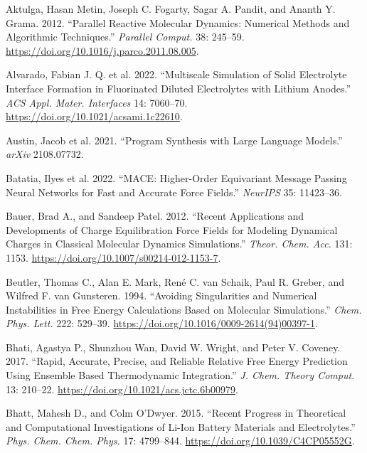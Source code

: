 \documentclass[
  11pt,
]{article}
\newlength{\cslhangindent}
\newenvironment{CSLReferences}[2] %
 {\begin{list}{}{%
  \setlength{\itemindent}{0pt}
  \setlength{\leftmargin}{0pt}
  \setlength{\parsep}{0pt}
  \ifodd #1
   \setlength{\leftmargin}{\cslhangindent}
   \setlength{\itemindent}{-1\cslhangindent}
  \fi
  \setlength{\itemsep}{#2\baselineskip}}}
 {\end{list}}
\begin{document}
\protect{}\label{refs}
\begin{CSLReferences}{1}{1}
Aktulga, Hasan Metin, Joseph C. Fogarty, Sagar A. Pandit, and Ananth Y.
Grama. 2012. {``Parallel Reactive Molecular Dynamics: Numerical Methods
and Algorithmic Techniques.''} \emph{Parallel Comput.} 38: 245--59.
\url{https://doi.org/10.1016/j.parco.2011.08.005}.

{Alvarado, Fabian J. Q. et al.} 2022. {``Multiscale Simulation of Solid
Electrolyte Interface Formation in Fluorinated Diluted Electrolytes with
Lithium Anodes.''} \emph{ACS Appl. Mater. Interfaces} 14: 7060--70.
\url{https://doi.org/10.1021/acsami.1c22610}.

{Austin, Jacob et al.} 2021. {``Program Synthesis with Large Language
Models.''} \emph{arXiv} 2108.07732.

{Batatia, Ilyes et al.} 2022. {``{MACE}: Higher-Order Equivariant
Message Passing Neural Networks for Fast and Accurate Force Fields.''}
\emph{NeurIPS} 35: 11423--36.

Bauer, Brad A., and Sandeep Patel. 2012. {``Recent Applications and
Developments of Charge Equilibration Force Fields for Modeling Dynamical
Charges in Classical Molecular Dynamics Simulations.''} \emph{Theor.
Chem. Acc.} 131: 1153. \url{https://doi.org/10.1007/s00214-012-1153-7}.

Beutler, Thomas C., Alan E. Mark, René C. van Schaik, Paul R. Greber,
and Wilfred F. van Gunsteren. 1994. {``Avoiding Singularities and
Numerical Instabilities in Free Energy Calculations Based on Molecular
Simulations.''} \emph{Chem. Phys. Lett.} 222: 529--39.
\url{https://doi.org/10.1016/0009-2614(94)00397-1}.

Bhati, Agastya P., Shunzhou Wan, David W. Wright, and Peter V. Coveney.
2017. {``Rapid, Accurate, Precise, and Reliable Relative Free Energy
Prediction Using Ensemble Based Thermodynamic Integration.''} \emph{J.
Chem. Theory Comput.} 13: 210--22.
\url{https://doi.org/10.1021/acs.jctc.6b00979}.

Bhatt, Mahesh D., and Colm O'Dwyer. 2015. {``Recent Progress in
Theoretical and Computational Investigations of {Li}-Ion Battery
Materials and Electrolytes.''} \emph{Phys. Chem. Chem. Phys.} 17:
4799--844. \url{https://doi.org/10.1039/C4CP05552G}.


\end{CSLReferences}
\end{document}
